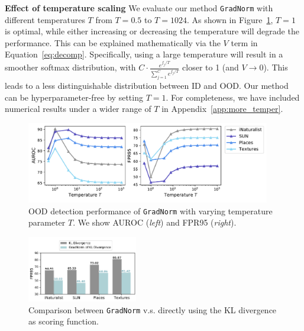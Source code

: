 \documentclass{article}
\begin{document}
\textbf{Effect of temperature scaling} We evaluate our method \texttt{GradNorm} with different temperatures $T$ from $T=0.5$ to $T=1024$. As shown in Figure~\ref{fig:temper_ablation}, $T=1$ is optimal, while either increasing or decreasing the temperature will degrade the performance. This can be explained mathematically via the $V$ term in Equation~\ref{eq:decomp}. Specifically, using a large temperature will result in a smoother softmax distribution, with $C \cdot \frac{e^{f_j / T}}{\sum_{j=1}^C e^{{f_{j}} / T}}$ closer to 1 (and $V\rightarrow 0$). This leads to a less distinguishable distribution between ID and OOD. Our method can be hyperparameter-free by setting $T=1$. For completeness, we have included numerical results under a wider range of $T$ in Appendix~\ref{app:more_temper}.


\begin{figure}[h]
\centering
    \vspace{-0.2cm}
    \includegraphics[width=0.95\textwidth]{figures/temperature_trend_new.pdf}
    \caption{\small{OOD detection performance of \texttt{GradNorm} with varying temperature parameter $T$. We show AUROC (\emph{left}) and FPR95 (\emph{right}).}}
    \label{fig:temper_ablation}
\end{figure}

\begin{figure}
\vspace{-1.5cm}
    \includegraphics[width=0.43\textwidth]{figures/direct_kl_vs_gradnorm.pdf}
    \vspace{-0.3cm}
    \caption{\small{Comparison between \texttt{GradNorm} v.s. directly using the KL divergence as scoring function.}}
    \vspace{-0.5cm}
    \label{fig:kl_ablation}
\end{figure}
\end{document}
